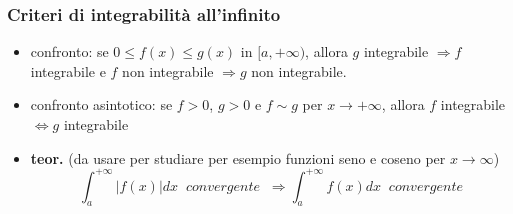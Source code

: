 \subsubsection{Criteri di integrabilità all'infinito}
\begin{itemize}
    \item confronto: se $0\leq f(x) \leq g(x)$ in $[a,+\infty)$, allora $g$ integrabile $\Rightarrow f$ integrabile e $f$ non integrabile $\Rightarrow g$ non integrabile.
    \item confronto asintotico: se $f>0$, $g>0$ e $f \sim g$ per $x \rightarrow + \infty$, allora $f$ integrabile $\Leftrightarrow g$ integrabile
    \item \textbf{teor.} (da usare per studiare per esempio funzioni seno e coseno per $x \rightarrow \infty$)
    \[
        \int_{a}^{+\infty}|f(x)| dx \;\; convergente \;\; \Rightarrow \int_{a}^{+\infty} f(x) dx \;\;convergente
    \]
\end{itemize}
